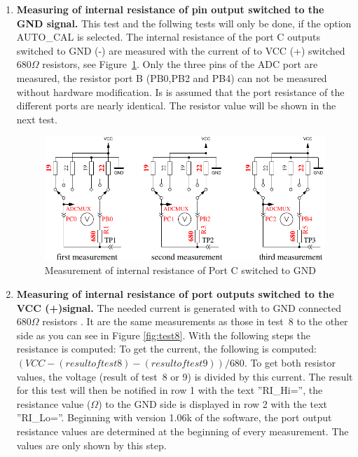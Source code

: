 \begin{enumerate}
\item {\bf Measuring of internal resistance of pin output switched to the GND signal.}
This test and the follwing tests will only be done, if the option AUTO\_CAL is selected.
The internal resistance of the port C outputs switched to GND (-) are measured with the current
of to VCC (+) switched \(680\Omega\) resistors, see Figure~\ref{fig:test7}.
Only the three pins of the ADC port are measured, the resistor port B (PB0,PB2 and PB4) can not be measured
without hardware modification.
Is is assumed that the port resistance of the different ports are nearly identical.
The resistor value will be shown in the next test.
\begin{figure}[H]
\centering
\includegraphics[]{../FIG/Test7.pdf}
\caption{Measurement of internal resistance of Port C switched to GND }
\label{fig:test7}
\end{figure}

\item {\bf Measuring of internal resistance of port outputs switched to the VCC (+)signal.}
The needed current is generated with to GND connected \(680\Omega\) resistors .
It are the same measurements as those in test~8 to the other side as you can see in Figure \ref{fig:test8}.
With the following steps the resistance is computed:
To get the current, the following is computed:  \((VCC - (result of test 8) - (result of test 9)) / 680\).
To get both resistor values, the voltage (result of test~8 or 9) is divided by this current.
The result for this test will then be notified in row 1 with the text ''RI\_Hi='', the resistance value (\(\Omega\)) to the GND side is
displayed in row 2 with the text ''RI\_Lo=''.
Beginning with version 1.06k of the software, the port output resistance values are determined at the beginning of every
measurement. The values are only shown by this step.


\end{enumerate}
